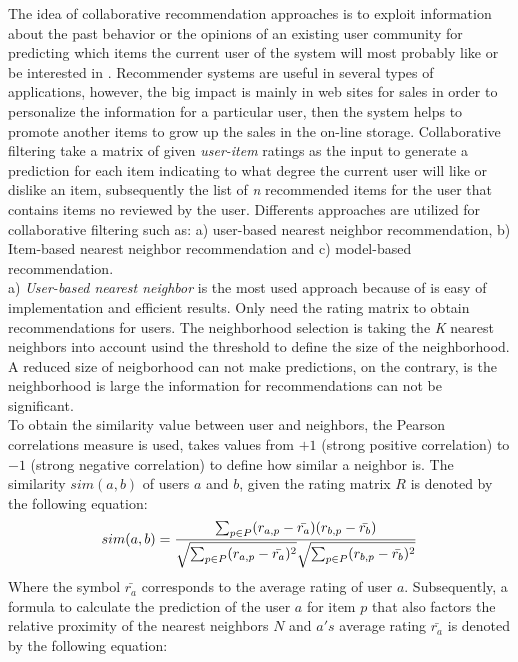The idea of collaborative recommendation approaches is to exploit
information about the past behavior or the opinions of an existing
user community for predicting which items the current user of the
system will most probably like or be interested in
\cite{anIntroduction}. Recommender systems are useful in several types
of  applications, however, the big impact is mainly in web sites for
sales in order to  personalize the information for a particular user,
then the system helps to  promote another items to grow up the sales
in the on-line storage. Collaborative filtering  take a matrix of
given \textit{user-item} ratings as the input to generate a prediction
for each item  indicating to what degree the current user will like or
dislike  an item, subsequently the list of \textit{n} recommended %
items for the user that contains items no reviewed by the user.
Differents approaches are utilized for collaborative filtering such
as:  a) user-based nearest neighbor recommendation, b) Item-based
nearest neighbor  recommendation and c) model-based recommendation.\\
a) \textit{User-based nearest neighbor} is the most used approach because
of is easy of implementation and efficient results. Only need the
rating matrix to obtain recommendations for users. The neighborhood
selection is taking the \textit{K} nearest neighbors into account
usind the threshold to define  the size of the neighborhood. A reduced
size of neigborhood can not make predictions, on the  contrary, is the
neighborhood is large the information for recommendations can not be
significant.\\ To obtain the similarity value between user and
neighbors, the Pearson correlations measure is used, takes values from
$+1$ (strong positive correlation) to $-1$ (strong negative
correlation) to define how similar a neighbor is. The similarity
$sim(a,b)$ of users $a$ and $b$, given the rating matrix $R$ is
denoted by the following equation:
\begin{equation}\label{eq:pearson1}
\displaystyle sim(a,b) = {\sum_{p \in P}(r_{a,p} - 
\bar{r_a})(r_{b,p}- \bar{r_b}) 
\over \sqrt{\sum_{p \in P}(r_{a,p} - \bar{r_a})^2} 
\sqrt{\sum_{p \in P} 
(r_{b,p}- \bar{r_b})^2}}
\end{equation}
Where the symbol $\bar{r_a}$ corresponds to the average rating of user
$a$. Subsequently, a formula to calculate the prediction of the user
$a$ for item $p$ that also factors the relative proximity of the
nearest neighbors $N$ and $a's$ average rating $\bar{r_a}$ is denoted
by the following equation:
